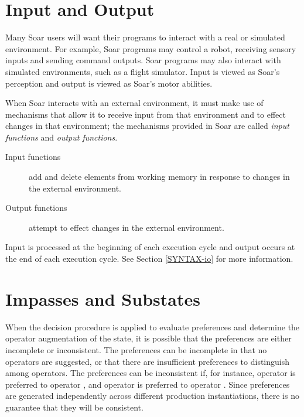 \section{Input and Output}
\label{ARCH-io}	%

Many Soar users will want their programs to interact with a real or simulated environment. For example, Soar programs may control a robot, receiving sensory inputs and sending command outputs. Soar programs may also interact with simulated environments, such as a flight simulator. Input is viewed as Soar's perception and output is viewed as Soar's motor abilities.

When Soar interacts with an external environment, it must make use of mechanisms that allow it to receive input from that environment and to effect changes in that environment; the mechanisms provided in Soar are called \textit{input functions} and \textit{output functions}.

\vspace{-12pt}
\begin{description}
	\item[Input functions] add and delete elements from working memory in response to changes in the external environment.
	\vspace{-6pt}
	\item[Output functions] attempt to effect changes in the external environment. 
	\vspace{-6pt}
\end{description}

Input is processed at the beginning of each execution cycle and output occurs at the end of each execution cycle. See Section \ref{SYNTAX-io} for more information.


\section{Impasses and Substates}
\label{ARCH-impasses}

When the decision procedure is applied to evaluate preferences and determine the operator augmentation of the state, it is possible that the preferences are either incomplete or inconsistent. The preferences can be incomplete in that no  operators are suggested, or that there are insufficient preferences to distinguish among  operators. The preferences can be inconsistent if, for instance, operator  is preferred to operator , and operator  is preferred to operator . Since preferences are generated independently across different production instantiations, there is no guarantee that they will be consistent.

